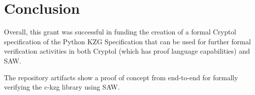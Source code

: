 \documentclass[12pt]{galois-whitepaper}
\begin{document}
\section{Conclusion}

Overall, this grant was successful in funding the creation of a formal Cryptol specification of
the Python KZG Specification that can be used for further formal verification activities in both
Cryptol (which has proof language capabilities) and SAW.

The repository artifacts show a proof of concept from end-to-end for formally verifying the c-kzg
library using SAW.
\end{document}
